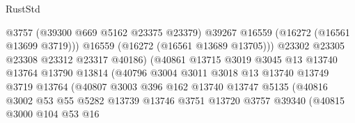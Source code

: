 \begin{lexlean}{RustStd}
\begin{coremodule}
                                          @3757
                                          (@39300 @669 @5162 @23375 @23379)
                                          @39267
                                          @16559
                                          (@16272 (@16561 @13699 @3719)))
                                        @16559
                                        (@16272 (@16561 @13689 @13705)))
                                      @23302
                                      @23305
                                      @23308
                                      @23312
                                      @23317
                                      @40186)
                                    (@40861
                                      @13715
                                      @3019
                                      @3045
                                      @13
                                      @13740
                                      @13764
                                      @13790
                                      @13814
                                      (@40796
                                        @3004
                                        @3011
                                        @3018
                                        @13
                                        @13740
                                        @13749
                                        @3719
                                        @13764
                                        (@40807
                                          @3003
                                          @396
                                          @162
                                          @13740
                                          @13747
                                          @5135
                                          (@40816
                                            @3002
                                            @53
                                            @55
                                            @5282
                                            @13739
                                            @13746
                                            @3751
                                            @13720
                                            @3757
                                            @39340
                                            (@40815
                                              @3000
                                              @104
                                              @53
                                              @16

\end{coremodule}
\end{lexlean}
